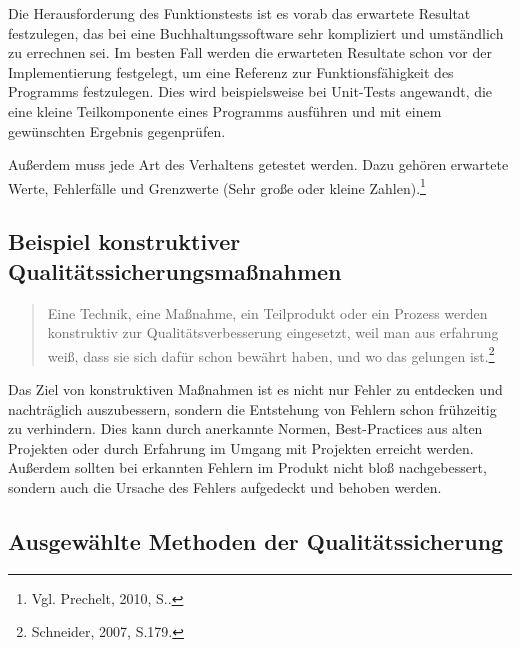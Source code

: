                 Die Herausforderung des Funktionstests ist es vorab das erwartete Resultat festzulegen, das bei eine Buchhaltungssoftware sehr kompliziert und umständlich zu errechnen sei. Im besten Fall werden die erwarteten Resultate schon vor der Implementierung festgelegt, um eine Referenz zur Funktionsfähigkeit des Programms festzulegen. Dies wird beispielsweise bei Unit-Tests angewandt, die eine kleine Teilkomponente eines Programms ausführen und mit einem gewünschten Ergebnis gegenprüfen.

                Außerdem muss jede Art des Verhaltens getestet werden. Dazu gehören erwartete Werte, Fehlerfälle und Grenzwerte (Sehr große oder kleine Zahlen).\footnote{Vgl. Prechelt, 2010, S..}

        \subsection{Beispiel konstruktiver Qualitätssicherungsmaßnahmen}

            \begin{quote}
                Eine Technik, eine Maßnahme, ein Teilprodukt oder ein Prozess werden konstruktiv zur Qualitätsverbesserung eingesetzt, weil man aus erfahrung weiß, dass sie sich dafür schon bewährt haben, und wo das gelungen ist.\footnote{Schneider, 2007, S.179.}
            \end{quote}

            Das Ziel von konstruktiven Maßnahmen ist es nicht nur Fehler zu entdecken und nachträglich auszubessern, sondern die Entstehung von Fehlern schon frühzeitig zu verhindern. Dies kann durch anerkannte Normen, Best-Practices aus alten Projekten oder durch Erfahrung im Umgang mit Projekten erreicht werden. Außerdem sollten bei erkannten Fehlern im Produkt nicht bloß nachgebessert, sondern auch die Ursache des Fehlers aufgedeckt und behoben werden.



        \subsection{Ausgewählte Methoden der Qualitätssicherung}

